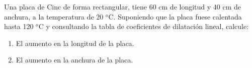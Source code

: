 
Una placa de Cinc de forma rectangular, tiene 60 cm de longitud y 40 cm de anchura, a la temperatura de 20 $^{o}$C. Suponiendo que la placa fuese calentada hasta 120 $^{o}$C y consultando la tabla de coeficientes de dilatación lineal, calcule:
\begin{enumerate}
	\item El aumento en la longitud de la placa.
	\item El aumento en la anchura de la placa.
\end{enumerate}